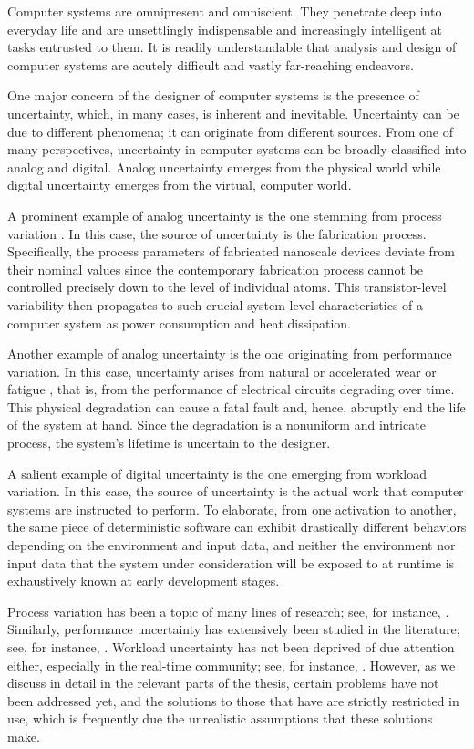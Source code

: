 Computer systems are omnipresent and omniscient. They penetrate deep into
everyday life and are unsettlingly indispensable and increasingly intelligent at
tasks entrusted to them. It is readily understandable that analysis and design
of computer systems are acutely difficult and vastly far-reaching endeavors.

One major concern of the designer of computer systems is the presence of
uncertainty, which, in many cases, is inherent and inevitable. Uncertainty can
be due to different phenomena; it can originate from different sources. From one
of many perspectives, uncertainty in computer systems can be broadly classified
into analog and digital. Analog uncertainty emerges from the physical world
while digital uncertainty emerges from the virtual, computer world.

A prominent example of analog uncertainty is the one stemming from process
variation \cite{srivastava2010}. In this case, the source of uncertainty is the
fabrication process. Specifically, the process parameters of fabricated
nanoscale devices deviate from their nominal values since the contemporary
fabrication process cannot be controlled precisely down to the level of
individual atoms. This transistor-level variability then propagates to such
crucial system-level characteristics of a computer system as power consumption
and heat dissipation.

Another example of analog uncertainty is the one originating from performance
variation. In this case, uncertainty arises from natural or accelerated wear or
fatigue \cite{jedec2016}, that is, from the performance of electrical circuits
degrading over time. This physical degradation can cause a fatal fault and,
hence, abruptly end the life of the system at hand. Since the degradation is a
nonuniform and intricate process, the system's lifetime is uncertain to the
designer.

A salient example of digital uncertainty is the one emerging from workload
variation. In this case, the source of uncertainty is the actual work that
computer systems are instructed to perform. To elaborate, from one activation to
another, the same piece of deterministic software can exhibit drastically
different behaviors depending on the environment and input data, and neither the
environment nor input data that the system under consideration will be exposed
to at runtime is exhaustively known at early development stages.

Process variation has been a topic of many lines of research; see, for instance,
\cite{bhardwaj2006, bhardwaj2008, chandra2010, juan2012, lee2013}. Similarly,
performance uncertainty has extensively been studied in the literature; see, for
instance, \cite{coskun2006, huang2009b, das2014c}. Workload uncertainty has not
been deprived of due attention either, especially in the real-time community;
see, for instance, \cite{diaz2002, santinelli2011, quinton2012, tanasa2015}.
However, as we discuss in detail in the relevant parts of the thesis, certain
problems have not been addressed yet, and the solutions to those that have are
strictly restricted in use, which is frequently due the unrealistic assumptions
that these solutions make.

